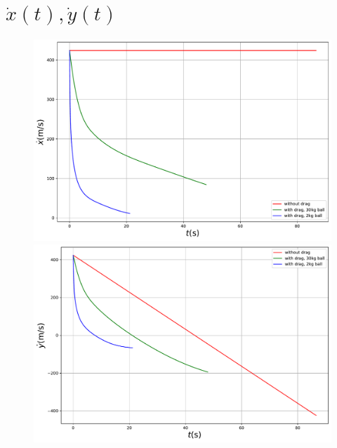 \documentclass[a4paper,12pt]{article}
\begin{document}
	\section{$\dot{x}(t),\dot{y}(t)$}
	\begin{figure}[h]
		\centering
		\includegraphics[width=0.874\linewidth]{../figures/vxplot}
		\includegraphics[width=0.874\linewidth]{../figures/vyplot}
	\end{figure}
	\newpage
\end{document}
